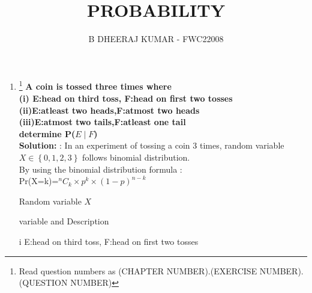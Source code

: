 \documentclass{article}
\providecommand{\cbrak}[1]{\ensuremath{\left\{#1\right\}}}
\newcommand{\solution}{\noindent \textbf{Solution: }}
\begin{document}
\title{PROBABILITY}
\author{\Large B DHEERAJ KUMAR - FWC22008}
\date{}

\maketitle
\begin{enumerate}[label=13.\arabic{enumi}.\arabic{enumii}]%
\setcounter{enumi}{0}
\setcounter{enumii}{6}

\item \footnote{Read question numbers as (CHAPTER NUMBER).(EXERCISE NUMBER).(QUESTION NUMBER)}
\textbf {A coin is tossed three times where \\
(i) E:head on third toss, F:head on first two tosses\\
(ii)E:atleast two heads,F:atmost two heads\\
(iii)E:atmost two tails,F:atleast one tail\\
determine P($E \mid F$) }\\[1ex]
\solution:
In an experiment of tossing a coin 3 times, random variable $X \in \cbrak{0,1,2,3}$ follows binomial distribution.\\
By using the binomial distribution formula :\\
Pr(X=k)=$^{n}C_k \times p^k \times (1-p)^{n-k}$\\
\vspace{5mm}
\begin{table}[h]
\centering

\caption{Random variable $X$}
\label{tab:5} 
\end{table}
\begin{table}[h]
\centering
	
\caption{variable and Description}
\label{tab:2} 
\end{table}
\item[i] E:head on third toss, F:head on first two tosses


\end{enumerate}
\end{document}
